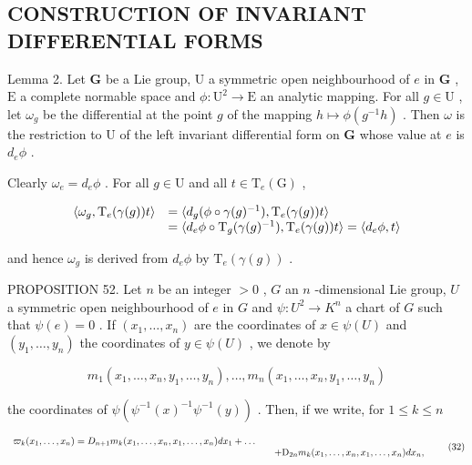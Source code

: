 \subsection{CONSTRUCTION OF INVARIANT DIFFERENTIAL FORMS}

Lemma 2. Let \(\mathbf{G}\) be a Lie group, \(\mathrm{U}\) a symmetric open neighbourhood of \(e\) in \(\mathbf{G}\) , \(\mathrm{E}\) a complete normable space and \(\phi: \mathrm{U}^2 \to \mathrm{E}\) an analytic mapping. For all \(g \in \mathrm{U}\) , let \(\omega_g\) be the differential at the point \(g\) of the mapping \(h \mapsto \phi(g^{-1}h)\) . Then \(\omega\) is the restriction to \(\mathrm{U}\) of the left invariant differential form on \(\mathbf{G}\) whose value at \(e\) is \(d_e\phi\) .

Clearly \(\omega_{e} = d_{e}\phi\) . For all \(g \in \mathrm{U}\) and all \(t \in \mathrm{T}_{e}(\mathrm{G})\) ,

\[
\begin{array}{r l} \langle \omega_ {g}, \mathrm{T} _ {e} (\gamma (g)) t \rangle & = \langle d _ {g} (\phi \circ \gamma (g) ^ {- 1}), \mathrm{T} _ {e} (\gamma (g)) t \rangle \\ & = \langle d _ {e} \phi \circ \mathrm{T} _ {g} (\gamma (g) ^ {- 1}), \mathrm{T} _ {e} (\gamma (g)) t \rangle = \langle d _ {e} \phi , t \rangle \end{array}
\]

and hence \(\omega_{g}\) is derived from \(d_{e}\phi\) by \(\mathrm{T}_{e}(\gamma(g))\) .

PROPOSITION 52. Let \(n\) be an integer \(>0\) , \(G\) an \(n\) -dimensional Lie group, \(U\) a symmetric open neighbourhood of \(e\) in \(G\) and \(\psi: U^2 \to K^n\) a chart of \(G\) such that \(\psi(e) = 0\) . If \((x_1, \ldots, x_n)\) are the coordinates of \(x \in \psi(U)\) and \((y_1, \ldots, y_n)\) the coordinates of \(y \in \psi(U)\) , we denote by

\[
m _ {1} (x _ {1}, \dots , x _ {n}, y _ {1}, \dots , y _ {n}), \dots , m _ {n} (x _ {1}, \dots , x _ {n}, y _ {1}, \dots , y _ {n})
\]

the coordinates of \(\psi (\psi^{-1}(x)^{-1}\psi^{-1}(y))\) . Then, if we write, for \(1\leqslant k\leqslant n\)

\[
\begin{array}{r l} \varpi_ {k} (x _ {1}, \ldots , x _ {n}) = D _ {n + 1} m _ {k} (x _ {1}, \ldots , x _ {n}, x _ {1}, \ldots , x _ {n}) d x _ {1} + \dots \\ & \quad + \mathrm{D} _ {2 n} m _ {k} (x _ {1}, \ldots , x _ {n}, x _ {1}, \ldots , x _ {n}) d x _ {n}, \end{array}\tag{32}
\]

